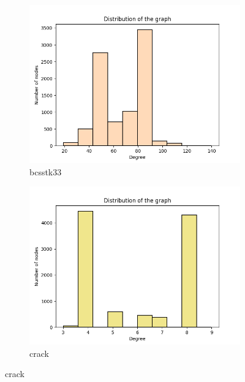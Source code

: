 
\begin{figure}[h!]
\centering
\begin{subfigure}[b]{.35\textwidth}
  \centering
  \includegraphics[width=\linewidth]{small_graphs/bcsstk33.png}  
  \caption{bcsstk33}
  \label{fig:sub-first}
\end{subfigure}
\begin{subfigure}[b]{.35\textwidth}
  \centering
  \includegraphics[width=\linewidth]{small_graphs/crack.png}  
  \caption{crack}
  \label{fig:sub-second}
\end{subfigure}


\end{figure}
